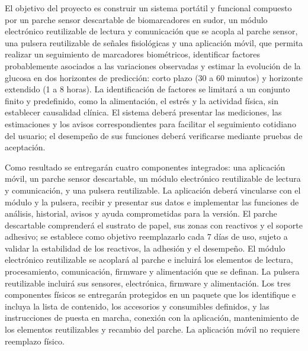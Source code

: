 El objetivo del proyecto es construir un sistema portátil y funcional compuesto por un parche sensor descartable de biomarcadores en sudor, un módulo electrónico reutilizable de lectura y comunicación que se acopla al parche sensor, una pulsera reutilizable de señales fisiológicas y una aplicación móvil, que permita realizar un seguimiento de marcadores biométricos, identificar factores probablemente asociados a las variaciones observadas y estimar la evolución de la glucosa en dos horizontes de predicción: corto plazo (30 a 60 minutos) y horizonte extendido (1 a 8 horas). La identificación de factores se limitará a un conjunto finito y predefinido, como la alimentación, el estrés y la actividad física, sin establecer causalidad clínica. El sistema deberá presentar las mediciones, las estimaciones y los avisos correspondientes para facilitar el seguimiento cotidiano del usuario; el desempeño de sus funciones deberá verificarse mediante pruebas de aceptación.

Como resultado se entregarán cuatro componentes integrados: una aplicación móvil, un parche sensor descartable, un módulo electrónico reutilizable de lectura y comunicación, y una pulsera reutilizable. La aplicación deberá vincularse con el módulo y la pulsera, recibir y presentar sus datos e implementar las funciones de análisis, historial, avisos y ayuda comprometidas para la versión. El parche descartable comprenderá el sustrato de papel, sus zonas con reactivos y el soporte adhesivo; se establece como objetivo reemplazarlo cada 7 días de uso, sujeto a validar la estabilidad de los reactivos, la adhesión y el desempeño. El módulo electrónico reutilizable se acoplará al parche e incluirá los elementos de lectura, procesamiento, comunicación, firmware y alimentación que se definan. La pulsera reutilizable incluirá sus sensores, electrónica, firmware y alimentación. Los tres componentes físicos se entregarán protegidos en un paquete que los identifique e incluya la lista de contenido, los accesorios y consumibles definidos, y las instrucciones de puesta en marcha, conexión con la aplicación, mantenimiento de los elementos reutilizables y recambio del parche. La aplicación móvil no requiere reemplazo físico.



